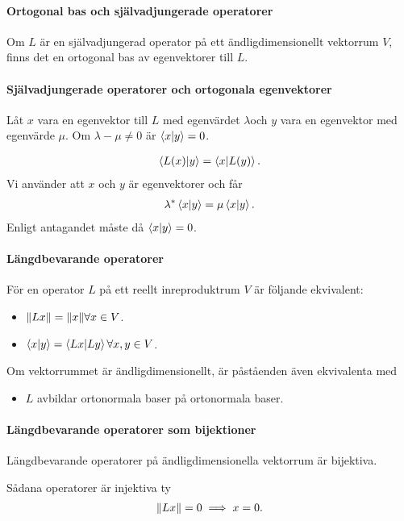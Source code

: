 \paragraph{Ortogonal bas och självadjungerade operatorer}
Om $L$ är en självadjungerad operator på ett ändligdimensionellt vektorrum $V$, finns det en ortogonal bas av egenvektorer till $L$.

\proof

\paragraph{Självadjungerade operatorer och ortogonala egenvektorer}
Låt $x$ vara en egenvektor till $L$ med egenvärdet $\lambda $och $y$ vara en egenvektor med egenvärde $\mu$. Om $\lambda - \mu \neq 0$ är $\bra{x}\ket{y} = 0$.

\proof
\begin{align*}
	\bra{L(x)}\ket{y} = \bra{x}\ket{L(y)}.
\end{align*}
Vi använder att $x$ och $y$ är egenvektorer och får
\begin{align*}
	\lambda^{*}\bra{x}\ket{y} = \mu\bra{x}\ket{y}.
\end{align*}
Enligt antagandet måste då $\bra{x}\ket{y} = 0$.

\paragraph{Längdbevarande operatorer}
För en operator $L$ på ett reellt inreproduktrum $V$ är följande ekvivalent:
\begin{itemize}
	\item $\norm{Lx} = \norm{x}\forall x\in V$.
	\item $\bra{x}\ket{y} = \bra{Lx}\ket{Ly}\forall x, y\in V$.
\end{itemize}
Om vektorrummet är ändligdimensionellt, är påståenden även ekvivalenta med
\begin{itemize}
	\item $L$ avbildar ortonormala baser på ortonormala baser.
\end{itemize}

\proof

\paragraph{Längdbevarande operatorer som bijektioner}
Längdbevarande operatorer på ändligdimensionella vektorrum är bijektiva.

\proof
Sådana operatorer är injektiva ty
\begin{align*}
	\norm{Lx} = 0 \implies x = 0.
\end{align*}

